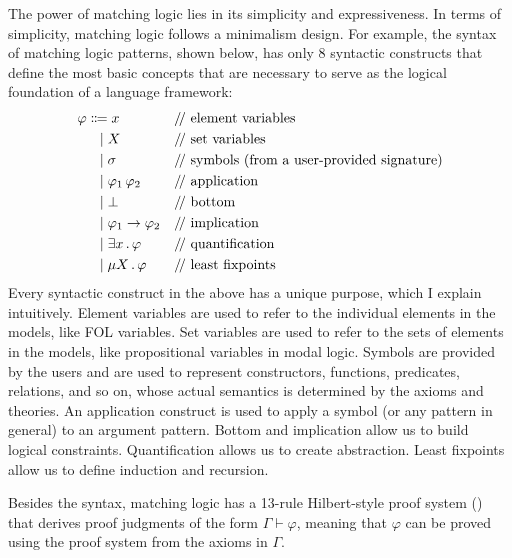 \documentclass[11pt]{article}
\begin{document}
The power of matching logic lies in its simplicity and expressiveness. 
In terms of simplicity, matching logic follows a minimalism design. 
For example, the syntax of matching logic patterns, shown below, has only 8 
syntactic constructs that define the most
basic concepts that are necessary to serve as the logical foundation of a 
language framework:
\begin{align*}
\varphi &\Coloneqq x &&\text{\Slash element variables} \\
&\ \ \mid X && \text{\Slash set variables} \\
&\ \ \mid \sigma && \text{\Slash symbols (from a user-provided signature)} \\
&\ \ \mid \varphi_1 \, \varphi_2 && \text{\Slash application} \\
&\ \ \mid \bot && \text{\Slash bottom} \\
&\ \ \mid \varphi_1 \imp \varphi_2 && \text{\Slash implication} \\
&\ \ \mid \exists x \ld \varphi && \text{\Slash quantification} \\
&\ \ \mid \mu X \ld \varphi && \text{\Slash least fixpoints}
\end{align*}
Every syntactic construct in the above has a unique purpose, which I explain 
intuitively. 
Element variables are used to refer to the individual elements in the models,
like FOL variables.
Set variables are used to refer to the sets of elements in the models, like 
propositional variables in modal logic. 
Symbols are provided by the users and are used to represent constructors, 
functions, predicates, relations, and so on, whose actual semantics is 
determined by the axioms and theories. 
An application construct is used to apply a symbol (or any pattern in general)
to an argument pattern. 
Bottom and implication allow us to build logical constraints. 
Quantification allows us to create abstraction.
Least fixpoints allow us to define induction and recursion. 

Besides the syntax, matching logic has a 13-rule Hilbert-style proof system
() that derives proof judgments of the form
$\Gamma \vdash \varphi$, meaning that $\varphi$ can be proved using the proof 
system from the axioms in $\Gamma$. 
\end{document}

